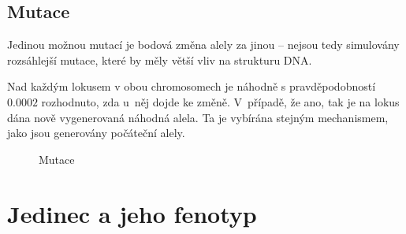 \subsection{Mutace}

Jedinou možnou mutací je bodová změna alely za jinou -- nejsou tedy simulovány rozsáhlejší mutace, které
by měly větší vliv na strukturu DNA.

Nad každým lokusem v obou chromosomech je náhodně s pravděpodobností $0.0002$ rozhodnuto, zda u~něj dojde ke změně.
V~případě, že ano, tak je na lokus dána nově vygenerovaná náhodná alela. Ta je vybírána stejným mechanismem, jako jsou
generovány počáteční alely.

\begin{figure}[h]
  \centering


  \caption{Mutace}
\end{figure}

\section{Jedinec a jeho fenotyp}

